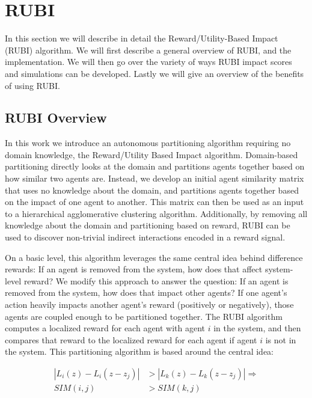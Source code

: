 \documentclass[letterpaper]{article}
\begin{document}

\section{RUBI}
In this section we will describe in detail the Reward/Utility-Based Impact (RUBI) algorithm. We will first describe a general overview of RUBI, and the implementation. We will then go over the variety of ways RUBI impact scores and simulations can be developed. Lastly we will give an overview of the benefits of using RUBI.

\subsection{RUBI Overview}
In this work we introduce an autonomous partitioning algorithm requiring no domain knowledge, the Reward/Utility Based Impact algorithm. Domain-based partitioning directly looks at the domain and partitions agents together based on how similar two agents are. Instead, we develop an initial agent similarity matrix that uses no knowledge about the domain, and partitions agents together based on the impact of one agent to another. This matrix can then be used as an input to a hierarchical agglomerative clustering algorithm. Additionally, by removing all knowledge about the domain and partitioning based on reward, RUBI can be used to discover non-trivial indirect interactions encoded in a reward signal.

On a basic level, this algorithm leverages the same central idea behind difference rewards: If an agent is removed from the system, how does that affect system-level reward? We modify this approach to answer the question: If an agent is removed from the system, how does that impact other agents? If one agent's action heavily impacts another agent's reward (positively or negatively), those agents are coupled enough to be partitioned together. The RUBI algorithm computes a localized reward for each agent with agent $i$ in the system, and then compares that reward to the localized reward for each agent if agent $i$ is not in the system. This partitioning algorithm is based around the central idea:

\begin{align}
|L_i(z) - L_i(z-z_j)| &> |L_k(z) - L_k(z-z_j)|   \Rightarrow \\
SIM(i,j) &> SIM(k,j) \nonumber
\end{align}
\end{document}
